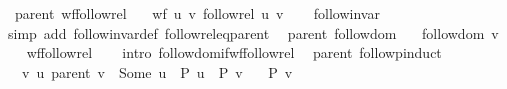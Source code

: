 \begin{isabellebody}
\isadelimproof
\isanewline
%
\endisadelimproof
\isanewline
{}\isamarkupfalse%
\ {\isacharparenleft}{\kern0pt}\ parent{\isacharparenright}{\kern0pt}\ wf{\isacharunderscore}{\kern0pt}follow{\isacharunderscore}{\kern0pt}rel{\isacharcolon}{\kern0pt}\isanewline
\ \ \ {\isachardoublequoteopen}wf\ {\isacharbraceleft}{\kern0pt}{\isacharparenleft}{\kern0pt}u{\isacharcomma}{\kern0pt}\ v{\isacharparenright}{\kern0pt}{\isachardot}{\kern0pt}\ follow{\isacharunderscore}{\kern0pt}rel\ u\ v{\isacharbraceright}{\kern0pt}{\isachardoublequoteclose}\isanewline
%
\isadelimproof
\ \ %
\endisadelimproof
%
\isatagproof
{}\isamarkupfalse%
\ follow{\isacharunderscore}{\kern0pt}invar\isanewline
\ \ \isamarkupfalse%
\ {\isacharparenleft}{\kern0pt}simp\ add{\isacharcolon}{\kern0pt}\ follow{\isacharunderscore}{\kern0pt}invar{\isacharunderscore}{\kern0pt}def\ follow{\isacharunderscore}{\kern0pt}rel{\isacharunderscore}{\kern0pt}eq{\isacharunderscore}{\kern0pt}parent{\isacharparenright}{\kern0pt}%
\endisatagproof
{\isafoldproof}%
%
\isadelimproof
\isanewline
%
\endisadelimproof
\isanewline
{}\isamarkupfalse%
\ {\isacharparenleft}{\kern0pt}\ parent{\isacharparenright}{\kern0pt}\ follow{\isacharunderscore}{\kern0pt}dom{\isacharcolon}{\kern0pt}\isanewline
\ \ \ {\isachardoublequoteopen}follow{\isacharunderscore}{\kern0pt}dom\ v{\isachardoublequoteclose}\isanewline
%
\isadelimproof
\ \ %
\endisadelimproof
%
\isatagproof
{}\isamarkupfalse%
\ wf{\isacharunderscore}{\kern0pt}follow{\isacharunderscore}{\kern0pt}rel\isanewline
\ \ \isamarkupfalse%
\ {\isacharparenleft}{\kern0pt}intro\ follow{\isacharunderscore}{\kern0pt}dom{\isacharunderscore}{\kern0pt}if{\isacharunderscore}{\kern0pt}wf{\isacharunderscore}{\kern0pt}follow{\isacharunderscore}{\kern0pt}rel{\isacharparenright}{\kern0pt}%
\endisatagproof
{\isafoldproof}%
%
\isadelimproof
\isanewline
%
\endisadelimproof
\isanewline
{}\isamarkupfalse%
\ {\isacharparenleft}{\kern0pt}\ parent{\isacharparenright}{\kern0pt}\ follow{\isacharunderscore}{\kern0pt}pinduct{\isacharcolon}{\kern0pt}\isanewline
\ \ \ {\isachardoublequoteopen}{\isasymAnd}v{\isachardot}{\kern0pt}\ {\isacharparenleft}{\kern0pt}{\isasymAnd}u{\isachardot}{\kern0pt}\ parent\ v\ {\isacharequal}{\kern0pt}\ Some\ u\ {\isasymLongrightarrow}\ P\ u{\isacharparenright}{\kern0pt}\ {\isasymLongrightarrow}\ P\ v{\isachardoublequoteclose}\isanewline
\ \ \ {\isachardoublequoteopen}P\ v{\isachardoublequoteclose}\isanewline

\end{isabellebody}
